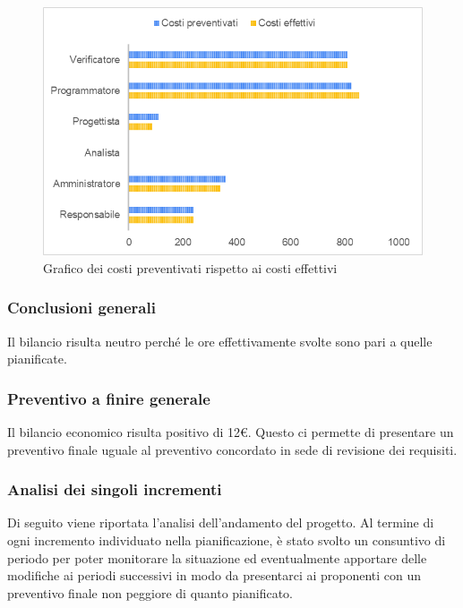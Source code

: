 \begin{figure} [H]
	\includegraphics[width=\linewidth]{./img/Grafici/ra-consuntivo2.png}
	\caption{Grafico dei costi preventivati rispetto ai costi effettivi}
\end{figure}


\subsubsection{Conclusioni generali}
Il bilancio risulta neutro perché le ore effettivamente svolte sono pari a quelle pianificate. 
\subsubsection{Preventivo a finire generale}
Il bilancio economico risulta positivo di 12\euro. Questo ci permette di presentare un preventivo finale uguale al preventivo concordato in sede di revisione dei requisiti.

\subsubsection{Analisi dei singoli incrementi}
Di seguito viene riportata l'analisi dell'andamento del progetto\glo. Al termine di ogni incremento individuato nella pianificazione, è stato svolto un consuntivo di periodo per poter monitorare la situazione ed eventualmente apportare delle modifiche ai periodi successivi in modo da presentarci ai proponenti con un preventivo finale non peggiore di quanto pianificato.
